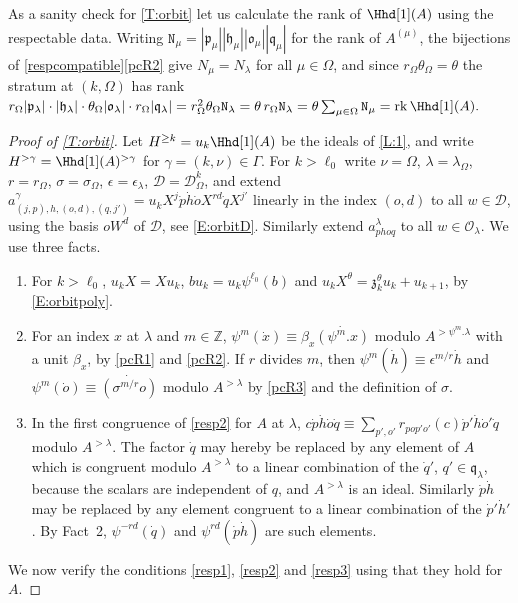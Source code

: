 \documentclass[a4paper,11pt]{amsart}
\numberwithin{equation}{subsection}
\theoremstyle{definition}
\theoremstyle{theorem}
\theoremstyle{remark}
\newcommand\CO{\mathcal{O}}
\newcommand\kapp{{\mathfrak{z}}}
\newcommand\plam[1][\lambda]{\mathfrak{p}_{#1}}
\newcommand\hlam[1][\lambda]{\mathfrak{h}_{#1}}
\newcommand\qlam[1][\lambda]{\mathfrak{q}_{#1}}
\newcommand\Olam[1][\lambda]{\CO_{#1}}
\newcommand\olam[1][\lambda]{\mathfrak{o}_{#1}}
\newcommand\op{\operatorname}
\newcommand\Z{\mathbb{Z}}
\begin{document}
\begin{Remark}
As a sanity check for \autoref{T:orbit}  let us calculate the rank of $\Hhd[1](A)$ using the respectable data.
Writing $\mathtt{N}_\mu=|\plam[\mu]||\hlam[\mu]||\olam[\mu]||\qlam[\mu]|$ for the
rank of $A^{(\mu)}$, the bijections of \autoref{respcompatible}\autoref{pcR2} give
$N_\mu=N_\lambda$ for all $\mu\in\Omega$, and since $r_\Omega\theta_\Omega=\theta$
the stratum at $(k,\Omega)$ has rank
$r_\Omega|\plam|\cdot|\hlam|\cdot\theta_\Omega|\olam|\cdot r_\Omega|\qlam|
  =r_\Omega^{2}\theta_\Omega \mathtt{N}_\lambda
  =\theta\,r_\Omega \mathtt{N}_\lambda
  =\theta\sum_{\mu\in\Omega}\mathtt{N}_\mu=\op{rk}\Hhd[1](A).$
\end{Remark}
\begin{proof}[Proof of \autoref{T:orbit}]
Let $H^{\ge k}=u_k\Hhd[1](A)$ be the ideals of \autoref{L:1}, and write
$H^{>\gamma}=\Hhd[1](A)^{>\gamma}$ for $\gamma=(k,\nu)\in\Gamma$. For $k>\ell_0$ write
$\nu=\Omega$, $\lambda=\lambda_\Omega$, $r=r_\Omega$, $\sigma=\sigma_\Omega$,
$\epsilon=\epsilon_\lambda$, $\mathcal D=\mathcal D^{k}_\Omega$, and extend
$a^{\gamma}_{(j,p),h,(o,d),(q,j')}=u_kX^{j}\dot p\dot h\dot oX^{rd}\dot qX^{j'}$ linearly in
the index $(o,d)$ to all $w\in\mathcal D$, using the basis $oW^{d}$ of $\mathcal D$, see \autoref{E:orbitD}. Similarly extend $a^{\lambda}_{phoq}$ to all $w\in\Olam$. We use three facts.
\begin{enumerate}[label=Fact~\arabic*.,leftmargin=*]
\item For $k>\ell_0$, $u_kX=Xu_k$, $bu_k=u_k\psi^{\ell_0}(b)$
  and $u_kX^{\theta}=\kapp_k^{\theta}u_k+u_{k+1}$, by \autoref{E:orbitpoly}.
\item For an index $x$ at $\lambda$ and $m\in\Z$, $\psi^{m}(\dot x)\equiv\beta_x\dot{(\psi^{m}.x)}$
  modulo $A^{>\psi^{m}.\lambda}$ with a unit $\beta_x$, by \autoref{pcR1} and \autoref{pcR2}.
  If $r$ divides $m$, then $\psi^{m}(\dot h)\equiv\epsilon^{m/r}\dot h$ and
  $\psi^{m}(\dot o)\equiv\dot{(\sigma^{m/r}o)}$ modulo $A^{>\lambda}$ by \autoref{pcR3} and the
  definition of $\sigma$.
\item In the first congruence of \autoref{resp2} for $A$ at $\lambda$,
  $c\dot p\dot h\dot o\dot q\equiv\sum_{p',o'}r_{pop'o'}(c)\dot p'\dot h\dot o'\dot q$ modulo
  $A^{>\lambda}$. The factor $\dot q$ may hereby be replaced by any element of $A$ which is congruent
  modulo $A^{>\lambda}$ to a linear combination of the $\dot q'$, $q'\in\qlam$, because the
  scalars are independent of $q$, and $A^{>\lambda}$ is an ideal. Similarly $\dot p\dot h$ may be
  replaced by any element congruent to a linear combination of the
  $\dot p'\dot h'$. By Fact~2, $\psi^{-rd}(\dot q)$ and $\psi^{rd}(\dot p\dot h)$ are such elements.
\end{enumerate}
We now verify the conditions \autoref{resp1}, \autoref{resp2} and \autoref{resp3} using that they hold for $A$.


\end{proof}
\end{document}
